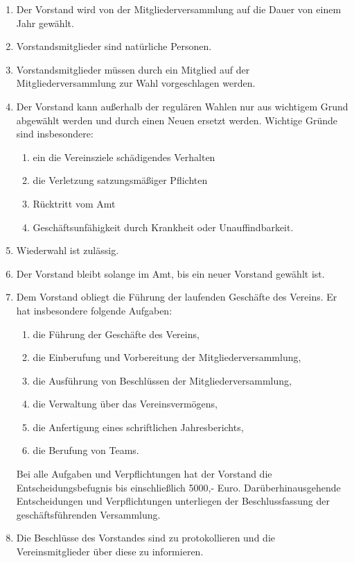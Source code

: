 \documentclass[german]{article}
\begin{document}
\begin{enumerate}
\begin{enumerate}
\item Der Vorstand wird von der Mitgliederversammlung auf die Dauer von einem Jahr gewählt.

\item Vorstandsmitglieder sind natürliche Personen.

\item Vorstandsmitglieder müssen durch ein Mitglied auf der Mitgliederversammlung zur Wahl vorgeschlagen werden.

\item Der Vorstand kann außerhalb der regulären Wahlen nur aus wichtigem Grund abgewählt werden und durch einen Neuen ersetzt werden. Wichtige Gründe sind insbesondere:
\begin{enumerate}
\item ein die Vereinsziele schädigendes Verhalten
\item die Verletzung satzungsmäßiger Pflichten
\item Rücktritt vom Amt
\item Geschäftsunfähigkeit durch Krankheit oder Unauffindbarkeit.
\end{enumerate}
\item Wiederwahl ist zulässig.

\item Der Vorstand bleibt solange im Amt, bis ein neuer Vorstand gewählt ist.

\item Dem Vorstand obliegt die Führung der laufenden Geschäfte des Vereins. Er hat insbesondere folgende Aufgaben:
\begin{enumerate}
\item die Führung der Geschäfte des Vereins,
\item die Einberufung und Vorbereitung der Mitgliederversammlung,
\item die Ausführung von Beschlüssen der Mitgliederversammlung,
\item die Verwaltung über das Vereinsvermögens,
\item die Anfertigung eines schriftlichen Jahresberichts,
\item die Berufung von Teams.
\end{enumerate}
Bei alle Aufgaben und Verpflichtungen hat der Vorstand die Entscheidungsbefugnis bis einschließlich 5000,- Euro. Darüberhinausgehende Entscheidungen und Verpflichtungen unterliegen der Beschlussfassung der geschäftsführenden Versammlung.

\item Die Beschlüsse des Vorstandes sind zu protokollieren und die Vereinsmitglieder über diese zu informieren.


\end{enumerate}
\end{enumerate}
\end{document}
